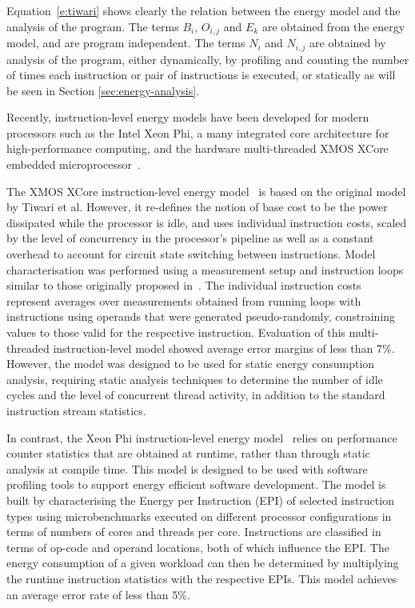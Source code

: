 Equation~\ref{e:tiwari} shows clearly the relation between the energy model and the
analysis of the program.  The terms $B_i$, $O_{i,j}$ and $E_k$ are obtained from the energy
model, and are program independent. The terms $N_i$ and $N_{i,j}$ are obtained by
analysis of the program, either dynamically, by profiling and counting the number of 
times each instruction or pair of instructions is executed, or statically as will be seen
in Section \ref{sec:energy-analysis}.


Recently, instruction-level energy models have been developed for modern
processors such as the Intel Xeon Phi, a many integrated core architecture for
high-performance computing, and the hardware multi-threaded XMOS XCore embedded
microprocessor~\cite{XMOS:Arch}.

The XMOS XCore instruction-level energy
model~\cite{DBLP:journals/tecs/KerrisonE15} is based on the original model by
Tiwari et al. However, it re-defines the notion of base cost to be the power
dissipated while the processor is idle, and uses individual instruction costs,
scaled by the level of concurrency in the processor's pipeline as well as a
constant overhead to account for circuit state switching between instructions.
%
Model characterisation was performed using a measurement setup and instruction
loops similar to those originally proposed in~\cite{Tiwari-embedded-1994}. The
individual instruction costs represent averages over measurements obtained from
running loops with instructions using operands that were generated
pseudo-randomly, constraining values to those valid for the respective
instruction.
%
Evaluation of this multi-threaded instruction-level model showed average error
margins of less than 7\%.
%
However, the model was designed to be used for static energy consumption analysis,
requiring static analysis techniques to determine the number of idle cycles and
the level of concurrent thread activity, in addition to the standard
instruction stream statistics.

In contrast, the Xeon Phi instruction-level energy model~\cite{phimodel} relies
on performance counter statistics that are obtained at runtime, rather than
through static analysis at compile time. This model is designed to be used with
software profiling tools to support energy efficient software development. The
model is built by characterising the Energy per Instruction (EPI) of selected
instruction types using microbenchmarks executed on different processor
configurations in terms of numbers of cores and threads per core. Instructions
are classified in terms of op-code and operand locations, both of which
influence the EPI.
%
The energy consumption of a given workload can then be determined by
multiplying the runtime instruction statistics with the respective EPIs.
%
This model achieves an average error rate of less than 5\%.


